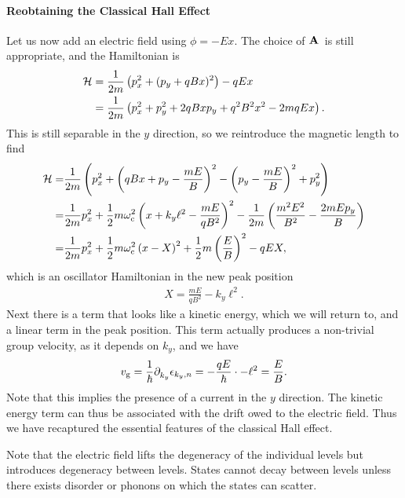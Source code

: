 \paragraph{Reobtaining the Classical Hall Effect}
Let us now add an electric field using $\phi = -Ex$. The choice of $\vb{A}$ is still appropriate, and the Hamiltonian is
\begin{align*}
	\mathcal{H} &= \frac{1}{2m}\left(p_{x}^{2} + (p_{y} + qBx)^{2}\right) - qEx \\
	     &= \frac{1}{2m}\left(p_{x}^{2} + p_{y}^{2} + 2qBxp_{y} + q^{2}B^{2}x^{2} - 2mqEx\right).
\end{align*}
This is still separable in the $y$ direction, so we reintroduce the magnetic length to find
\begin{align*}
	\mathcal{H} =& \frac{1}{2m}\left(p_{x}^{2} + \left(qBx + p_{y} - \frac{mE}{B}\right)^{2} - \left(p_{y} - \frac{mE}{B}\right)^{2} + p_{y}^{2}\right) \\
	     =& \frac{1}{2m}p_{x}^{2} + \frac{1}{2}m\omega_{\text{c}}^{2}\left(x + k_{y}\ell^{2} - \frac{mE}{qB^{2}}\right)^{2} - \frac{1}{2m}\left(\frac{m^{2}E^{2}}{B^{2}} - \frac{2mEp_{y}}{B}\right) \\
	     =& \frac{1}{2m}p_{x}^{2} + \frac{1}{2}m\omega_{\text{c}}^{2}\left(x - X\right)^{2} + \frac{1}{2}m\left(\frac{E}{B}\right)^{2} - qEX,
\end{align*}
which is an oscillator Hamiltonian in the new peak position
\begin{align*}
	X = \frac{mE}{qB^{2}} - k_{y}\ell^{2}.
\end{align*}
Next there is a term that looks like a kinetic energy, which we will return to, and a linear term in the peak position. This term actually produces a non-trivial group velocity, as it depends on $k_{y}$, and we have
\begin{align*}
	v_{\text{g}} = \frac{1}{\hbar}\partial^{}_{k_{y}}\epsilon_{k_{y}, n} = -\frac{qE}{\hbar}\cdot -\ell^{2} = \frac{E}{B}.
\end{align*}
Note that this implies the presence of a current in the $y$ direction. The kinetic energy term can thus be associated with the drift owed to the electric field. Thus we have recaptured the essential features of the classical Hall effect.

Note that the electric field lifts the degeneracy of the individual levels but introduces degeneracy between levels. States cannot decay between levels unless there exists disorder or phonons on which the states can scatter.

